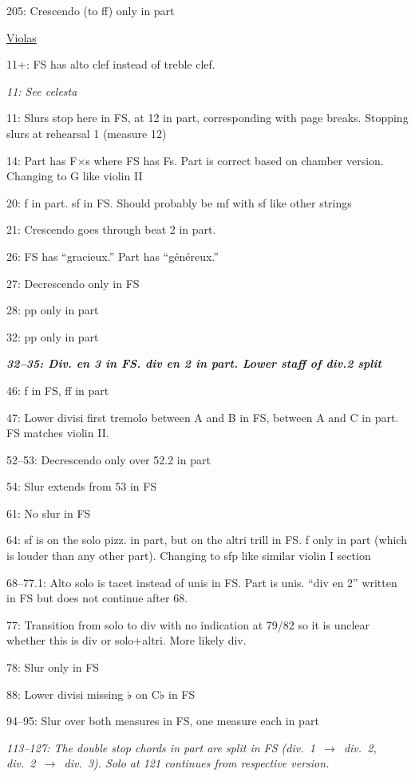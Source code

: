 \documentclass[twoside]{article}
\begin{document}
\begin{hangparas}{15pt}{1}
\begin{multicols}{2}
205: Crescendo (to ff) only in part

\underline{Violas}

11+: FS has alto clef instead of treble clef.

\textit{11: See celesta}

11: Slurs stop here in FS, at 12 in part, corresponding with page breaks. Stopping slurs at rehearsal 1 (measure 12)

14: Part has F$\times$s where FS has Fs. Part is correct based on chamber version. Changing to G like violin II

20: f in part. sf in FS. Should probably be mf with sf like other strings

21: Crescendo goes through beat 2 in part.

26: FS has ``gracieux.'' Part has ``généreux.''

27: Decrescendo only in FS

28: pp only in part

32: pp only in part

\textbf{\textit{32--35: Div. en 3 in FS. div en 2 in part. Lower staff of div.2 split}}

46: f in FS, ff in part

47: Lower divisi first tremolo between A and B in FS, between A and C in part. FS matches violin II.

52--53: Decrescendo only over 52.2 in part

54: Slur extends from 53 in FS

61: No slur in FS

64: sf is on the solo pizz. in part, but on the altri trill in FS. f only in part (which is louder than any other part). Changing to sfp like similar violin I section

68--77.1: Alto solo is tacet instead of unis in FS. Part is unis. ``div en 2'' written in FS but does not continue after 68.

77: Transition from solo to div with no indication at 79/82 so it is unclear whether this is div or solo+altri. More likely div.

78: Slur only in FS

88: Lower divisi missing ♭ on C♭ in FS

94--95: Slur over both measures in FS, one measure each in part

\textit{113--127: The double stop chords in part are split in FS (div.~1~$\rightarrow$~div.~2, div.~2~$\rightarrow$~div.~3). Solo at 121 continues from respective version.}


\end{multicols}
\end{hangparas}
\end{document}
